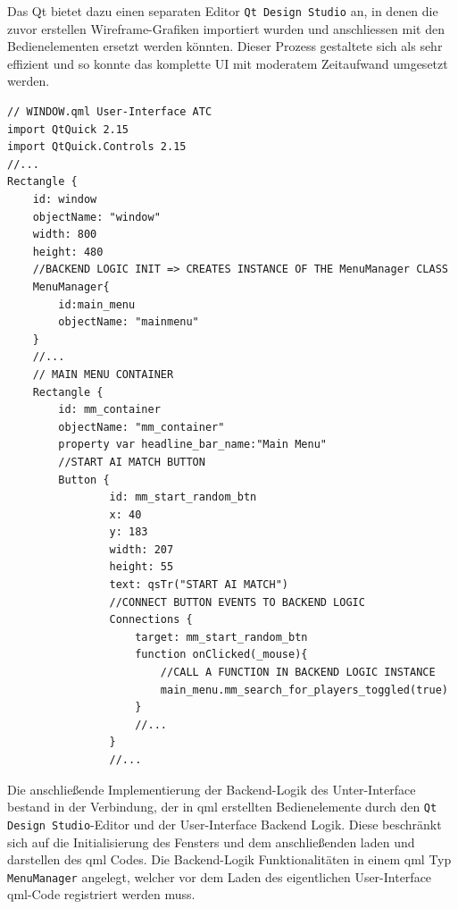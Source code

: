 Das Qt\cite{qtframework} bietet dazu einen separaten Editor
\passthrough{\lstinline!Qt Design Studio!} an, in denen die zuvor
erstellen Wireframe-Grafiken importiert wurden und anschliessen mit den
Bedienelementen ersetzt werden könnten. Dieser Prozess gestaltete sich
als sehr effizient und so konnte das komplette UI mit moderatem
Zeitaufwand umgesetzt werden.

\begin{lstlisting}
// WINDOW.qml User-Interface ATC
import QtQuick 2.15
import QtQuick.Controls 2.15
//...
Rectangle {
    id: window
    objectName: "window"
    width: 800
    height: 480
    //BACKEND LOGIC INIT => CREATES INSTANCE OF THE MenuManager CLASS
    MenuManager{
        id:main_menu
        objectName: "mainmenu"
    }
    //...
    // MAIN MENU CONTAINER
    Rectangle {
        id: mm_container
        objectName: "mm_container"
        property var headline_bar_name:"Main Menu"
        //START AI MATCH BUTTON
        Button {
                id: mm_start_random_btn
                x: 40
                y: 183
                width: 207
                height: 55
                text: qsTr("START AI MATCH")
                //CONNECT BUTTON EVENTS TO BACKEND LOGIC
                Connections {
                    target: mm_start_random_btn
                    function onClicked(_mouse){
                        //CALL A FUNCTION IN BACKEND LOGIC INSTANCE
                        main_menu.mm_search_for_players_toggled(true)
                    }
                    //...
                }
                //...
\end{lstlisting}

Die anschließende Implementierung der Backend-Logik des Unter-Interface
bestand in der Verbindung, der in \gls{qml} erstellten Bedienelemente
durch den \passthrough{\lstinline!Qt Design Studio!}-Editor und der
User-Interface Backend Logik. Diese beschränkt sich auf die
Initialisierung des Fensters und dem anschließenden laden und darstellen
des \gls{qml} Codes. Die Backend-Logik Funktionalitäten in einem
\gls{qml} Typ \passthrough{\lstinline!MenuManager!} angelegt, welcher
vor dem Laden des eigentlichen User-Interface \gls{qml}-Code registriert
werden muss.

